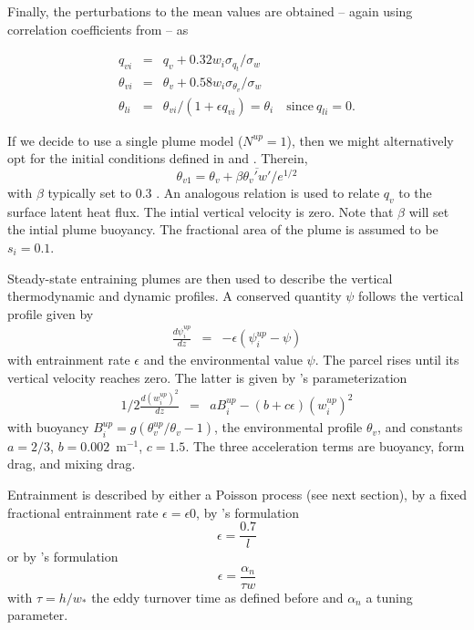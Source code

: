 \documentclass[dvipdfmx,a4paper,10pt]{article}
\begin{document}
Finally, the perturbations to the mean values are obtained -- again using correlation coefficients from \cite{cheinet03a} -- as 

\begin{eqnarray}
 q_{vi}&=&q_{v}+0.32 w_i  \sigma_{q_t}/\sigma_w\\
 \theta_{vi}&=&\theta_{v}+0.58 w_i  \sigma_{\theta_v}/\sigma_w\\
  \theta_{li}&=&\theta_{vi}/(1+\epsilon q_{vi})=\theta_i \quad\mathrm{since}~q_{li}=0.
\end{eqnarray}


If we decide to use a single plume model ($N^{up}=1$), then we might alternatively opt for the initial conditions defined in \cite{soares04} and \cite{witek11}. Therein, 
\begin{equation}
 \theta_{v1} =  \theta_{v}+\beta \overline{\theta_v'w'}/e^{1/2}
\end{equation}
with $\beta$ typically set to 0.3 \citep{soares04,witek11}. An analogous relation is used to relate $q_v$ to the surface latent heat flux. The intial vertical velocity is zero. Note that $\beta$ will set the intial plume buoyancy. The fractional area of the plume is assumed to be $s_i=0.1$.

Steady-state entraining plumes are then used to describe the vertical thermodynamic and dynamic profiles. A conserved quantity $\psi$ follows the vertical profile given by
\begin{eqnarray}\label{eqn:conserved}
 \frac{d\psi_i^{up} }{d z } &=& - \epsilon(\psi_i^{up} - \psi)
\end{eqnarray}
with entrainment rate $\epsilon$ and the environmental value $\psi$. The parcel rises until its vertical velocity reaches zero. The latter is given by \cite{simpson69a}'s parameterization
\begin{eqnarray}\label{eqn:w}
 1/2\frac{d (w_i^{up})^2 }{d z } &=& aB^{up}_i- (b+c\epsilon)(w_i^{up})^2
\end{eqnarray}
with buoyancy $B_i^{up}=g(\theta_v^{up}/\theta_v-1)$, the environmental profile $\theta_v$, and constants  $a=2/3$, $b=0.002$~m$^{-1}$, $c=1.5$. The three acceleration terms are buoyancy, form drag, and mixing drag. 

Entrainment is described by either a Poisson process (see next section), by a fixed fractional entrainment rate $\epsilon=\epsilon0$, by \cite{witek11}'s formulation
\begin{equation}
 \epsilon=\frac{0.7}{l}
\end{equation}
or by \cite{neggers02}'s formulation
\begin{equation}
 \epsilon=\frac{\alpha_n}{\tau w}
\end{equation}
with $\tau=h/w_*$ the eddy turnover time as defined before and $\alpha_n$ a tuning parameter.
\end{document}
